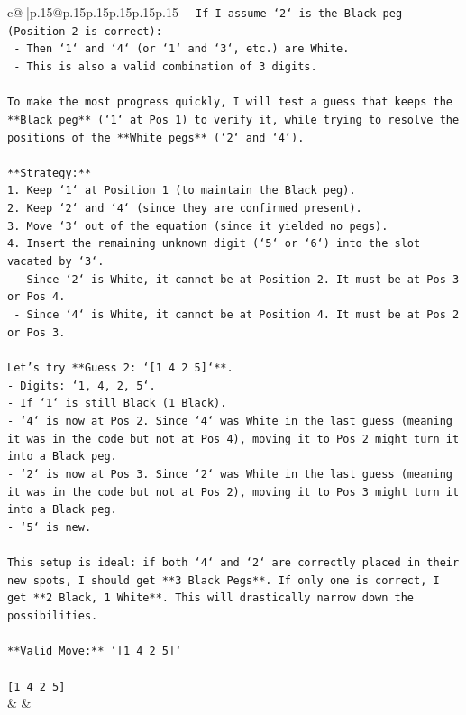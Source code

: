 \documentclass{article}
\begin{document}
{\begin{supertabular}{c@{$\;$}|p{.15\linewidth}@{}p{.15\linewidth}p{.15\linewidth}p{.15\linewidth}p{.15\linewidth}p{.15\linewidth}}
{{{\texttt{{-} If I assume `2` is the Black peg (Position 2 is correct):} \\
\texttt{  {-} Then `1` and `4` (or `1` and `3`, etc.) are White.} \\
\texttt{  {-} This is also a valid combination of 3 digits.} \\
\\ 
\texttt{To make the most progress quickly, I will test a guess that keeps the **Black peg** (`1` at Pos 1) to verify it, while trying to resolve the positions of the **White pegs** (`2` and `4`).} \\
\\ 
\texttt{**Strategy:**} \\
\texttt{1. Keep `1` at Position 1 (to maintain the Black peg).} \\
\texttt{2. Keep `2` and `4` (since they are confirmed present).} \\
\texttt{3. Move `3` out of the equation (since it yielded no pegs).} \\
\texttt{4. Insert the remaining unknown digit (`5` or `6`) into the slot vacated by `3`.} \\
\texttt{   {-} Since `2` is White, it cannot be at Position 2. It must be at Pos 3 or Pos 4.} \\
\texttt{   {-} Since `4` is White, it cannot be at Position 4. It must be at Pos 2 or Pos 3.} \\
\\ 
\texttt{Let's try **Guess 2: `{[}1 4 2 5{]}`**.} \\
\texttt{{-} Digits: `1, 4, 2, 5`.} \\
\texttt{{-} If `1` is still Black (1 Black).} \\
\texttt{{-} `4` is now at Pos 2. Since `4` was White in the last guess (meaning it was in the code but not at Pos 4), moving it to Pos 2 might turn it into a Black peg.} \\
\texttt{{-} `2` is now at Pos 3. Since `2` was White in the last guess (meaning it was in the code but not at Pos 2), moving it to Pos 3 might turn it into a Black peg.} \\
\texttt{{-} `5` is new.} \\
\\ 
\texttt{This setup is ideal: if both `4` and `2` are correctly placed in their new spots, I should get **3 Black Pegs**. If only one is correct, I get **2 Black, 1 White**. This will drastically narrow down the possibilities.} \\
\\ 
\texttt{**Valid Move:** `{[}1 4 2 5{]}`} \\
\\ 
\texttt{{[}1 4 2 5{]}} \\
            }
        }
    }
    & & \\ \\


\end{supertabular}}
\end{document}
